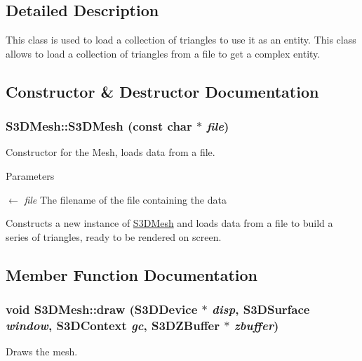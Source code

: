 \subsection{Detailed Description}
This class is used to load a collection of triangles to use it as an entity. This class allows to load a collection of triangles from a file to get a complex entity. 

\subsection{Constructor \& Destructor Documentation}
\hypertarget{class_s3_d_mesh_a810cf0f60312bc574e347d6248499258}{
\subsubsection[{S3DMesh}]{\setlength{\rightskip}{0pt plus 5cm}S3DMesh::S3DMesh (const char $\ast$ {\em file})}}
\label{class_s3_d_mesh_a810cf0f60312bc574e347d6248499258}


Constructor for the Mesh, loads data from a file. 


\begin{DoxyParams}{Parameters}
\item[\mbox{$\leftarrow$} {\em file}]The filename of the file containing the data\end{DoxyParams}
Constructs a new instance of \hyperlink{class_s3_d_mesh}{S3DMesh} and loads data from a file to build a series of triangles, ready to be rendered on screen. 

\subsection{Member Function Documentation}
\hypertarget{class_s3_d_mesh_afc47824c491991604931f4ccb0520cd1}{
\subsubsection[{draw}]{\setlength{\rightskip}{0pt plus 5cm}void S3DMesh::draw (S3DDevice $\ast$ {\em disp}, \/  S3DSurface {\em window}, \/  S3DContext {\em gc}, \/  {\bf S3DZBuffer} $\ast$ {\em zbuffer})}}
\label{class_s3_d_mesh_afc47824c491991604931f4ccb0520cd1}


Draws the mesh. 


